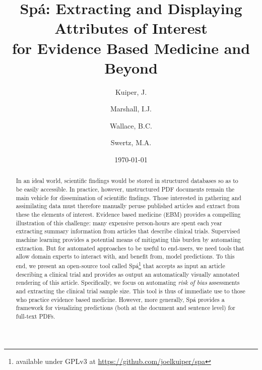 \documentclass[runningheads,a4paper]{llncs}
\institute{University of Groningen \and Kings College London \and Brown University}
\author{Kuiper, J\inst{1}. \and Marshall, I.J.\inst{2} \and Wallace, B.C.\inst{3} \and Swertz, M.A.\inst{1}}
\date{\today}
\title{Sp{\' a}: Extracting and Displaying Attributes of Interest \\ for Evidence Based Medicine and Beyond}
\begin{document}
\maketitle
\begin{abstract}
	
In an ideal world, scientific findings would be stored in structured databases so as to be easily accessible. In practice, however, unstructured PDF documents remain the main vehicle for dissemination of scientific findings. Those interested in gathering and assimilating data must therefore manually peruse published articles and extract from these the elements of interest. Evidence based medicine (EBM) provides a compelling illustration of this challenge: many expensive person-hours are spent each year extracting summary information from articles that describe clinical trials. Supervised machine learning provides a potential means of mitigating this burden by automating extraction. But for automated approaches to be useful to end-users, we need tools that allow domain experts to interact with, and benefit from, model predictions. To this end, we present an open-source tool called {Sp\'a}\footnote{available under GPLv3 at \url{https://github.com/joelkuiper/spa}} that accepts as input an article describing a clinical trial and provides as output an automatically visually annotated rendering of this article. Specifically, we focus on automating \emph{risk of bias} assessments and extracting the clinical trial sample size. This tool is thus of immediate use to those who practice evidence based medicine. However, more generally, {Sp\'a} provides a framework for visualizing predictions (both at the document and sentence level) for full-text PDFs. 




\end{abstract}
\end{document}

